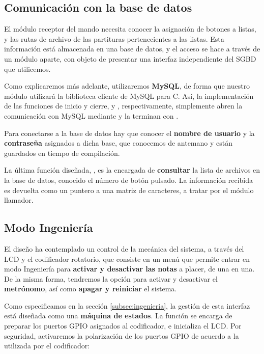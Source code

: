 \subsection{Comunicación con la base de datos}

El módulo receptor del mando necesita conocer la asignación de botones a listas, y las rutas de archivo de las partituras pertenecientes a las listas. Esta información está almacenada en una base de datos, y el acceso se hace a través de un módulo aparte, con objeto de presentar una interfaz independiente del \acrshort{SGBD} que utilicemos.

Como explicaremos más adelante, utilizaremos \textbf{MySQL}, de forma que nuestro módulo utilizará la biblioteca cliente de MySQL para C. Así, la implementación de las funciones de inicio y cierre,  y , respectivamente, simplemente abren la comunicación con MySQL mediante  y la terminan con .

Para conectarse a la base de datos hay que conocer el \textbf{nombre de usuario} y la \textbf{contraseña} asignados a dicha base, que conocemos de antemano y están guardados en tiempo de compilación.

La última función diseñada, , es la encargada de \textbf{consultar} la lista de archivos en la base de datos, conocido el número de botón pulsado. La información recibida es devuelta como un puntero a una matriz de caracteres, a tratar por el módulo llamador.

\subsection{Modo Ingeniería}

El diseño ha contemplado un control de la mecánica del sistema, a través del \acrshort{LCD} y el codificador rotatorio, que consiste en un menú que permite entrar en modo Ingeniería para \textbf{activar y desactivar las notas} a placer, de una en una. De la misma forma, tendremos la opción para activar y desactivar el \textbf{metrónomo}, así como \textbf{apagar y reiniciar} el sistema.

Como especificamos en la sección \ref{subsec:ingenieria}, la gestión de esta interfaz está diseñada como una \textbf{máquina de estados}. La función  se encarga de preparar los puertos \acrshort{GPIO} asignados al codificador, e inicializa el \acrshort{LCD}. Por seguridad, activaremos la polarización de los puertos \acrshort{GPIO} de acuerdo a la utilizada por el codificador:


